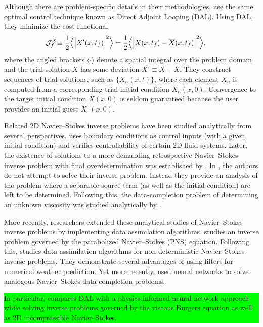 \documentclass[%
 reprint,
 amsmath,amssymb,
 aps,
 pre,
]{revtex4-2}
\newcommand{\hly}[1]{\colorbox{lime}{\parbox{\columnwidth}{#1}}}
\newcommand{\J}{\mathcal{J}}
\begin{document}
Although there are problem-specific details in their methodologies, \cite{Lukyanenko2021, Subramanian2020, Kabanikhin2020, Liu2008, Li2017} use the same optimal control technique known as Direct Adjoint Looping (DAL). 
Using DAL, they minimize the cost functional
\begin{align}
    \hspace{-0.2cm}\J_f^X \hspace{-0.1cm} &\equiv \frac{1}{2} \Big\langle\Big| X'(x, t_f) \Big|^2\Big\rangle = \frac{1}{2} \Big\langle\Big| X(x, t_f) - \overline{X}(x, t_f) \Big|^2\Big\rangle, \label{costintro}
\end{align}
where the angled brackets $\langle \cdot \rangle$ denote a spatial integral over the problem domain and the trial solution $X$ has some deviation $X' \equiv X - \overline{X}$.
They construct sequences of trial solutions, such as $\{X_{n}(x, t)\}$, where each element $X_{n}$ is computed from a corresponding trial initial condition $X_{n}(x, 0)$.
Convergence to the target initial condition $\overline{X}(x, 0)$ is seldom guaranteed because the user provides an initial guess $X_{0}(x, 0)$.

Related 2D Navier--Stokes inverse problems have been studied analytically from several perspectives.
\cite{Imanuvilov1997} uses boundary conditions as control inputs (with a given initial condition) and verifies controllability of certain 2D fluid systems.
Later, the existence of solutions to a more demanding retrospective Navier--Stokes inverse problem with final overdetermination was established by \cite{Fan2009}.
In \cite{Fan2009}, the authors do not attempt to solve their inverse problem.
Instead they provide an analysis of the problem where a separable source term (as well as the initial condition) are left to be determined. 
Following this, the data-completion problem of determining an unknown viscosity was studied analytically by \cite{Fan2010}.

More recently, researchers extended these analytical studies of Navier--Stokes inverse problems by implementing data assimilation algorithms.
\cite{Du2013} studies an inverse problem governed by the parabolized Navier--Stokes (PNS) equation.
Following this, \cite{Law2012} studies data assimilation algorithms for non-deterministic Navier--Stokes inverse problems. 
They demonstrate several advantages of using filters for numerical weather prediction.
Yet more recently, \cite{Fan2020, FrerixThomas2021VDAw, Zhao2022, mowlavi_optimal_2023} used neural networks to solve analogous Navier--Stokes data-completion problems.
\hly{In particular, \cite{mowlavi_optimal_2023} compares DAL with a physics-informed neural network approach while solving inverse problems governed by the viscous Burgers equation as well as 2D incompressible Navier--Stokes.}
\end{document}
